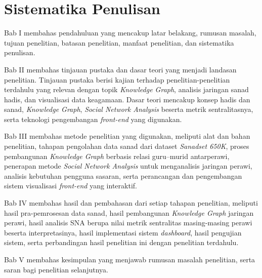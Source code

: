 \section{Sistematika Penulisan}

\noindent Bab I membahas pendahuluan yang mencakup latar belakang, rumusan masalah, tujuan penelitian, batasan penelitian, manfaat penelitian, dan sistematika penulisan.

\noindent Bab II membahas tinjauan pustaka dan dasar teori yang menjadi landasan penelitian. Tinjauan pustaka berisi kajian terhadap penelitian-penelitian terdahulu yang relevan dengan topik \textit{Knowledge Graph}, analisis jaringan sanad hadis, dan visualisasi data keagamaan. Dasar teori mencakup konsep hadis dan sanad, \textit{Knowledge Graph}, \textit{Social Network Analysis} beserta metrik sentralitasnya, serta teknologi pengembangan \textit{front-end} yang digunakan.

\noindent Bab III membahas metode penelitian yang digunakan, meliputi alat dan bahan penelitian, tahapan pengolahan data sanad dari dataset \textit{Sanadset 650K}, proses pembangunan \textit{Knowledge Graph} berbasis relasi guru--murid antarperawi, penerapan metode \textit{Social Network Analysis} untuk menganalisis jaringan perawi, analisis kebutuhan pengguna sasaran, serta perancangan dan pengembangan sistem visualisasi \textit{front-end} yang interaktif.

\noindent Bab IV membahas hasil dan pembahasan dari setiap tahapan penelitian, meliputi hasil pra-pemrosesan data sanad, hasil pembangunan \textit{Knowledge Graph} jaringan perawi, hasil analisis SNA berupa nilai metrik sentralitas masing-masing perawi beserta interpretasinya, hasil implementasi sistem \textit{dashboard}, hasil pengujian sistem, serta perbandingan hasil penelitian ini dengan penelitian terdahulu.

\noindent Bab V membahas kesimpulan yang menjawab rumusan masalah penelitian, serta saran bagi penelitian selanjutnya.

